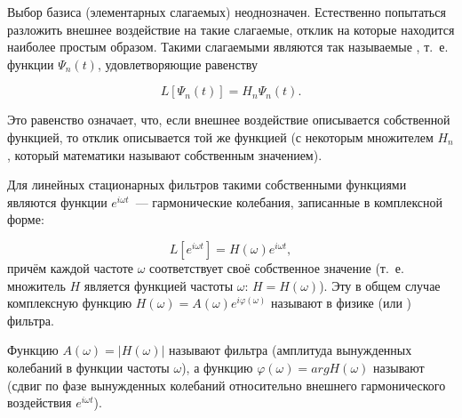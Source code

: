 Выбор базиса (элементарных слагаемых) неоднозначен. Естественно попытаться разложить внешнее воздействие на такие
слагаемые, отклик на которые находится наиболее простым образом. Такими слагаемыми являются так называемые
, т.~е. функции $\Psi_n(t)$, удовлетворяющие равенству

\begin{equation*}
	L[\Psi_n(t)]=H_n\Psi_n(t).
\end{equation*}

Это равенство означает, что, если внешнее воздействие описывается собственной функцией, то отклик описывается той же
функцией (с некоторым множителем $H_n$, который математики называют собственным значением).

Для линейных стационарных фильтров такими собственными функциями являются функции $e^{i\omega t}$~--- гармонические
колебания, записанные в комплексной форме:

\begin{equation*}
	L\left[e^{i\omega t}\right]=H(\omega)e^{i\omega t},
\end{equation*}
причём каждой частоте $\omega$ соответствует своё собственное значение (т.~е. множитель $H$ является функцией частоты
$\omega$: $H=H(\omega)$). Эту в общем случае комплексную функцию $H(\omega)=A(\omega)e^{i\varphi(\omega)}$ называют в физике
 (или ) фильтра.

Функцию $A(\omega)=|H(\omega)|$ называют  фильтра (амплитуда вынужденных колебаний в
функции частоты $\omega$), а функцию $\varphi(\omega)= arg H(\omega)$ называют  (сдвиг по фазе
вынужденных колебаний относительно внешнего гармонического воздействия $e^{i\omega t}$).



%


